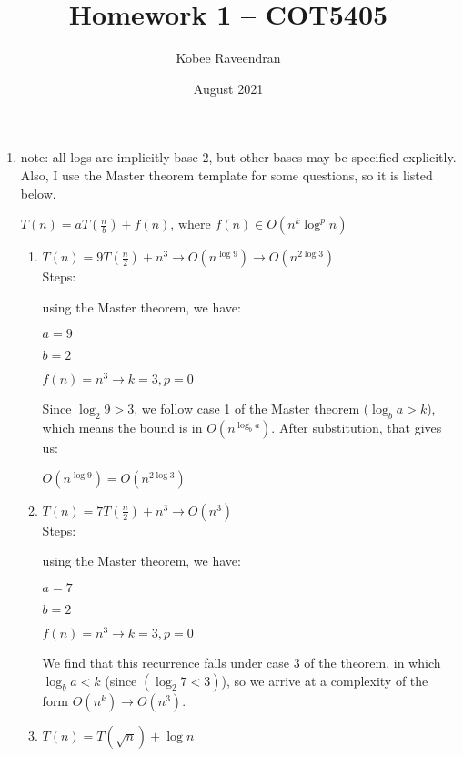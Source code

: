 \documentclass[12pt]{article}
\title{Homework 1 -- COT5405}
\author{Kobee Raveendran}
\date{August 2021}
\begin{document}
\maketitle

\begin{enumerate}
    \item note: all logs are implicitly base 2, but other bases may be specified explicitly. Also, I use the Master theorem template for some questions, so it is listed below.
    
    $T(n) = aT(\frac{n}{b}) + f(n)$, where $f(n) \in O(n^k\log^pn)$
    
    \begin{enumerate}
        \item $T(n) = 9T(\frac{n}{2})+n^3 \longrightarrow O(n^{\log9}) \longrightarrow O(n^{2\log3})$ \\
        
        Steps: 
        
        using the Master theorem, we have:
        
        $a = 9$
        
        $b = 2$
        
        $f(n) = n^3 \longrightarrow k = 3, p = 0$
        
        Since $\log_{2}9 > 3$, we follow case 1 of the Master theorem ($\log_{b}a > k$), which means the bound is in $O(n^{\log_{b}a})$. After substitution, that gives us:
        
        $O(n^{\log9}) = O(n^{2\log3})$\\
        
        \item $T(n) = 7T(\frac{n}{2}) + n^3 \longrightarrow O(n^3)$ \\
        
        Steps:
        
        using the Master theorem, we have:
        
        $a = 7$
        
        $b = 2$
        
        $f(n) = n^3 \longrightarrow k = 3, p = 0$
        
        We find that this recurrence falls under case 3 of the theorem, in which $\log_{b}{a} < k$ (since $(\log_{2}{7} < 3)$), so we arrive at a complexity of the form $O(n^k) \longrightarrow O(n^3)$.\\
        
        \item $T(n) = T(\sqrt{n}) + \log n$
        

\end{enumerate}
\end{enumerate}
\end{document}
